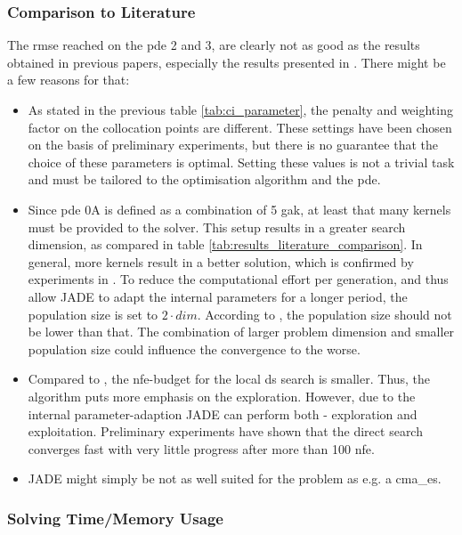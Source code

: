 \documentclass[./\jobname.tex]{subfiles}
\begin{document}
\subsubsection{Comparison to Literature}
The \gls{rmse} reached on the \gls{pde} 2 and 3, are clearly not as good as the results obtained in previous papers, especially the results presented in \cite{chaquet_using_2019}. There might be a few reasons for that: 
\begin{itemize}
	\item As stated in the previous table \ref{tab:ci_parameter}, the penalty and weighting factor on the collocation points are different. These settings have been chosen on the basis of preliminary experiments, but there is no guarantee that the choice of these parameters is optimal. Setting these values is not a trivial task and must be tailored to the optimisation algorithm and the \gls{pde}. 
	\item Since \gls{pde} 0A is defined as a combination of 5 \gls{gak}, at least that many kernels must be provided to the solver. This setup results in a greater search dimension, as compared in table \ref{tab:results_literature_comparison}. In general, more kernels result in a better solution, which is confirmed by experiments in \cite{chaquet_using_2019}. 
	To reduce the computational effort per generation, and thus allow JADE to adapt the internal parameters for a longer period, the population size is set to $2 \cdot dim$. According to \cite{mallipeddi_empirical_2008}, the population size should not be lower than that. The combination of larger problem dimension and smaller population size could influence the convergence to the worse. 
	\item Compared to \cite{chaquet_using_2019}, the \gls{nfe}-budget for the local \gls{ds} search is smaller. Thus, the algorithm puts more emphasis on the exploration. However, due to the internal parameter-adaption JADE can perform both - exploration and exploitation. Preliminary experiments have shown that the direct search converges fast with very little progress after more than 100 \gls{nfe}.  
	\item JADE might simply be not as well suited for the problem as e.g. a \gls{cma_es}. 
\end{itemize}



\subsubsection{Solving Time/Memory Usage}
\end{document}
